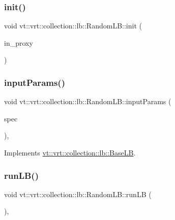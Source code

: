 \subsubsection{\texorpdfstring{init()}{init()}}
{\footnotesize\ttfamily void vt\+::vrt\+::collection\+::lb\+::\+Random\+L\+B\+::init (\begin{DoxyParamCaption}\item[{\hyperlink{structvt_1_1objgroup_1_1proxy_1_1_proxy}{objgroup\+::proxy\+::\+Proxy}$<$ \hyperlink{structvt_1_1vrt_1_1collection_1_1lb_1_1_random_l_b}{Random\+LB} $>$}]{in\+\_\+proxy }\end{DoxyParamCaption})}

\mbox{\label{structvt_1_1vrt_1_1collection_1_1lb_1_1_random_l_b_ae0269a00daa9a3111742d9ea35f5a542}} 
\subsubsection{\texorpdfstring{input\+Params()}{inputParams()}}
{\footnotesize\ttfamily void vt\+::vrt\+::collection\+::lb\+::\+Random\+L\+B\+::input\+Params (\begin{DoxyParamCaption}\item[{\hyperlink{structvt_1_1vrt_1_1collection_1_1balance_1_1_spec_entry}{balance\+::\+Spec\+Entry} $\ast$}]{spec }\end{DoxyParamCaption})\hspace{0.3cm}{\ttfamily [override]}, {\ttfamily [virtual]}}



Implements \hyperlink{structvt_1_1vrt_1_1collection_1_1lb_1_1_base_l_b_a555e29aadfd428383464d6dd007506b6}{vt\+::vrt\+::collection\+::lb\+::\+Base\+LB}.

\mbox{\label{structvt_1_1vrt_1_1collection_1_1lb_1_1_random_l_b_a7354965590d0ab010841a2a9086ce7e8}} 
\subsubsection{\texorpdfstring{run\+L\+B()}{runLB()}}
{\footnotesize\ttfamily void vt\+::vrt\+::collection\+::lb\+::\+Random\+L\+B\+::run\+LB (\begin{DoxyParamCaption}{ }\end{DoxyParamCaption})\hspace{0.3cm}{\ttfamily [override]}, {\ttfamily [virtual]}}



